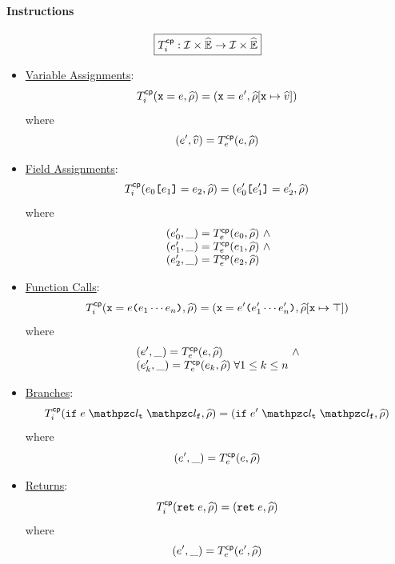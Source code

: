 \paragraph{Instructions}
\[
  \framebox{$\cptransformi: \instset \times \aenvset \rightarrow \instset \times
  \aenvset$}
\]
\begin{itemize}
  \item \underline{Variable Assignments}:
    \[
      T^{\textsf{cp}}_i(\texttt{x} = e, \widehat{\rho}) =
      (\texttt{x} = e', \widehat{\rho}[\texttt{x} \mapsto \widehat{v}])
    \]
    where
    \[
      (e', \widehat{v}) = T^{\textsf{cp}}_e(e, \widehat{\rho})
    \]

  \item \underline{Field Assignments}:
    \[
      T^{\textsf{cp}}_i(e_0 \texttt{[} e_1 \texttt{]} = e_2, \widehat{\rho}) =
      (e'_0 \texttt{[} e'_1 \texttt{]} = e'_2, \widehat{\rho})
    \]
    where
    \[
      \begin{array}{l@{~}c@{~}ll}
        (\expr'_0, \_) = \cptransforme(\expr_0, \aenv) &\wedge\\
        (\expr'_1, \_) = \cptransforme(\expr_1, \aenv) &\wedge\\
        (\expr'_2, \_) = \cptransforme(\expr_2, \aenv)\\
      \end{array}
    \]

  \item \underline{Function Calls}:
    \[
      T^{\textsf{cp}}_i(\texttt{x} = e \texttt{(} e_1 \cdots e_n \texttt{)}, \widehat{\rho}) =
      (\texttt{x} = e' \texttt{(} e'_1 \cdots e'_n \texttt{)},
      \widehat{\rho}[\texttt{x} \mapsto \top])
    \]
    where
    \[
      \begin{array}{l@{~}c@{~}ll}
        (\expr', \_) = \cptransforme(\expr, \aenv) &\wedge\\
        (\expr'_k, \_) = \cptransforme(\expr_k, \aenv) \; \forall 1 \leq k \leq
        n\\
      \end{array}
    \]

  \item \underline{Branches}:
    \[
      \cptransformi(\kwif \; \expr \; \lab_\vart \; \lab_\varf, \aenv) =
      (\kwif \; \expr' \; \lab_\vart \; \lab_\varf, \aenv)
    \]
    where
    \[
      (e', \_) = T^{\textsf{cp}}_e(e, \widehat{\rho})
    \]

  \item \underline{Returns}:
    \[
      T^{\textsf{cp}}_i(\texttt{ret} \; e, \widehat{\rho}) =
      (\texttt{ret} \; e, \widehat{\rho})
    \]
    where
    \[
      (e', \_) = T^{\textsf{cp}}_e(e', \widehat{\rho})
    \]
\end{itemize}

